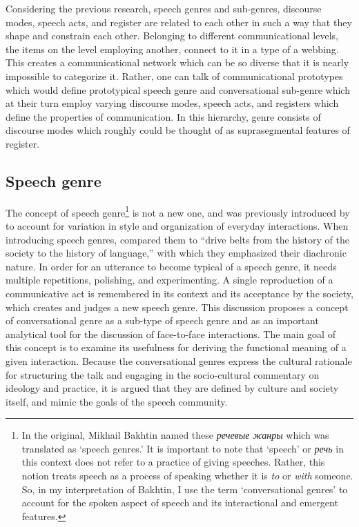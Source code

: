 \documentclass[12pt]{article}
\begin{document}
Considering the previous research, speech genres and sub-genres, discourse modes, speech acts, and register are related to each other in such a way that they shape and constrain each other. Belonging to different communicational levels, the items on the level employing another, connect to it in a type of a webbing. This creates a communicational network which can be so diverse that it is nearly impossible to categorize it. Rather, one can talk of communicational prototypes which would define prototypical speech genre and conversational sub-genre which at their turn employ varying discourse modes, speech acts, and registers which define the properties of communication. In this hierarchy, genre consists of discourse modes which roughly could be thought of as suprasegmental features of register.
\subsection{Speech genre}
The concept of speech genre\footnote{In the original, Mikhail Bakhtin named these \foreignlanguage{russian}{\textit{речевые жанры}} which was translated as `speech genres.' It is important to note that `speech' or \foreignlanguage{russian}{\textit{речь}} in this context does not refer to a  practice of giving speeches. Rather, this notion treats speech as a process of speaking whether it is \textit{to} or \textit{with} someone. So, in my interpretation of Bakhtin, I use the term `conversational genres' to account for the spoken aspect of speech and its interactional and emergent features.} is not a new one, and was previously introduced by \textcite{bakhtin1986} to account for variation in style and organization of everyday interactions. When introducing speech genres, \textcite[p. 65]{bakhtin1986} compared them to ``drive belts from the history of the society to the history of language,'' with which they emphasized their diachronic nature. In order for an utterance to become typical of a speech genre, it needs multiple repetitions, polishing, and experimenting. A single reproduction of a communicative act is remembered in its context and its acceptance by the society, which creates and judges a new speech genre. This discussion proposes a concept of conversational genre as a sub-type of speech genre and as an important analytical tool for the discussion of face-to-face interactions. The main goal of this concept is to examine its usefulness for deriving the functional meaning of a given interaction. Because the conversational genres express the cultural rationale for structuring the talk and engaging in the socio-cultural commentary on ideology and practice, it is argued that they are defined by culture and society itself, and mimic the goals of the speech community. 
\end{document}

